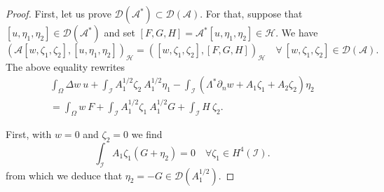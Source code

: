 \documentclass[10pt,a4paper]{amsart}
\begin{document}
\begin{proof}
First, let us prove $\mathcal{D}(\mathcal{A}^*)\subset \mathcal{D}(\mathcal{A})$. For that, suppose that $[u,\eta_1,\eta_2]\in \mathcal{D}(\mathcal{A}^*)$ and set $[F,G,H]=\mathcal{A}^*[u,\eta_1,\eta_2]\in \mathscr{H}$. We have
$$\left(\mathcal{A}[w,\zeta_1,\zeta_2],[u,\eta_1,\eta_2]\right)_{\mathscr{H}}=\left([w,\zeta_1,\zeta_2], [F,G,H]\right)_{\mathscr{H}}\quad \forall ~[w,\zeta_1,\zeta_2]\in \mathcal{D}(\mathcal{A}).$$
The above equality rewrites
\begin{multline}\label{Eq1proofAstar}
\int_\Omega\Delta w~u+\int_{\mathcal{I}}A_1^{1/2} \zeta_2 ~ A_1^{1/2}\eta_1-\int_{\mathcal{I}}(\Lambda^*\partial_n w+A_1\zeta_1+A_2\zeta_2)\eta_2\\
=\int_\Omega w~F+\int_{\mathcal{I}} A_1^{1/2}\zeta_1~ A_1^{1/2} G + \int_{\mathcal{I}}H~\zeta_2.
\end{multline}

First, with $w=0$ and $\zeta_2=0$ we find
$$\int_{\mathcal{I}}A_1 \zeta_1(G+\eta_2)=0 \quad\forall \zeta_1\in H^4(\mathcal{I}).$$ 
from which we deduce that $\eta_2=-G\in \mathcal{D}(A_1^{1/2})$. 


\end{proof}
\end{document}
